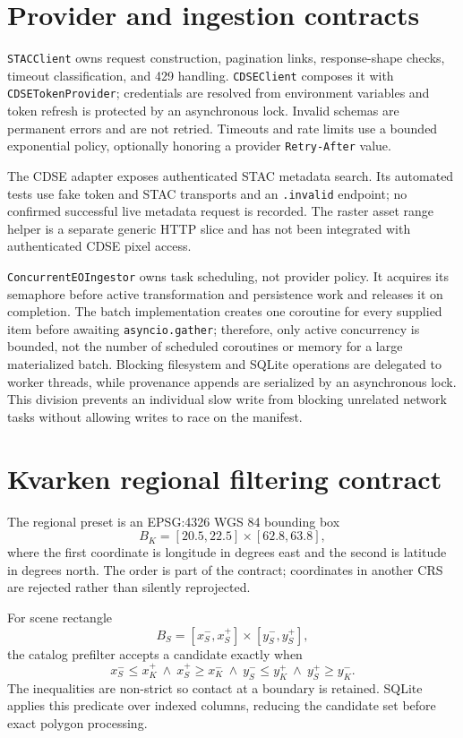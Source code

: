 \section{Provider and ingestion contracts}

\texttt{STACClient} owns request construction, pagination links, response-shape checks, timeout
classification, and 429 handling. \texttt{CDSEClient} composes it with
\nolinkurl{CDSETokenProvider}; credentials are resolved from environment variables and token refresh
is protected by an asynchronous lock. Invalid schemas are permanent errors and are not retried.
Timeouts and rate limits use a bounded exponential policy, optionally honoring a provider
\texttt{Retry-After} value.

The CDSE adapter exposes authenticated STAC metadata search. Its automated tests use fake
token and STAC transports and an \texttt{.invalid} endpoint; no confirmed successful live
metadata request is recorded. The raster asset range helper is a separate generic HTTP slice
and has not been integrated with authenticated CDSE pixel access.

\texttt{ConcurrentEOIngestor} owns task scheduling, not provider policy. It acquires its semaphore
before active transformation and persistence work and releases it on completion. The batch
implementation creates one coroutine for every supplied item before awaiting
\texttt{asyncio.gather}; therefore, only active concurrency is bounded, not the number of
scheduled coroutines or memory for a large materialized batch. Blocking filesystem and SQLite
operations are delegated to worker threads, while provenance appends are serialized by an
asynchronous lock. This division prevents an individual slow write from blocking unrelated
network tasks without allowing writes to race on the manifest.

\section{Kvarken regional filtering contract}

The regional preset is an EPSG:4326 WGS 84 bounding box
\[
 B_K=[20.5,22.5]\times[62.8,63.8],
\]
where the first coordinate is longitude in degrees east and the second is latitude in degrees
north. The order is part of the contract; coordinates in another CRS are rejected rather than
silently reprojected.

For scene rectangle
\[
B_S=[x^-_S,x^+_S]\times[y^-_S,y^+_S],
\]
the catalog prefilter accepts a candidate exactly when
\[
x^-_S\leq x^+_K\ \land\ x^+_S\geq x^-_K\ \land\
y^-_S\leq y^+_K\ \land\ y^+_S\geq y^-_K.
\]
The inequalities are non-strict so contact at a boundary is retained. SQLite applies this
predicate over indexed columns, reducing the candidate set before exact polygon processing.


